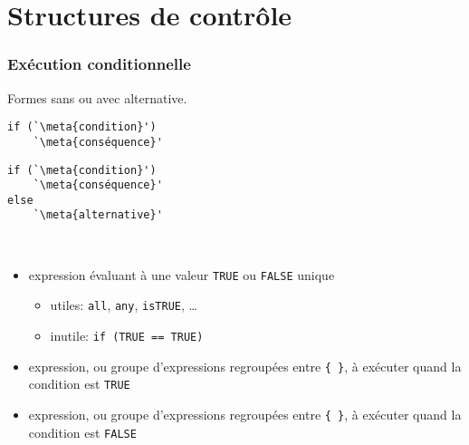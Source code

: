 \section{Structures de contrôle}

\begin{frame}[fragile=singleslide]
  \frametitle{Exécution conditionnelle}

  Formes sans ou avec alternative.

  \begin{minipage}{\linewidth}
    \begin{minipage}[t]{0.48\linewidth}
      \begin{Schunk}
\begin{lstlisting}
if (`\meta{condition}')
    `\meta{conséquence}'
\end{lstlisting}
      \end{Schunk}
    \end{minipage}
    \begin{minipage}[t]{0.48\linewidth}
      \begin{Schunk}
\begin{lstlisting}
if (`\meta{condition}')
    `\meta{conséquence}'
else
    `\meta{alternative}'
\end{lstlisting}
      \end{Schunk}
    \end{minipage} \\
    \mbox{}
  \end{minipage}
  \begin{itemize}
  \item {} expression évaluant à une valeur
    \texttt{TRUE} ou \texttt{FALSE} \alert{unique}
    \begin{itemize}
    \item utiles: \verb=all=, \verb=any=,
      \verb=isTRUE=, \dots
    \item inutile: \verb|if (TRUE == TRUE)|
    \end{itemize}
  \item {} expression, ou groupe d'expressions
    regroupées entre \verb={ }=, à exécuter quand la condition est
    \texttt{TRUE}
  \item {} expression, ou groupe d'expressions
    regroupées entre \verb={ }=, à exécuter quand la condition est
    \texttt{FALSE}
  \end{itemize}
\end{frame}

